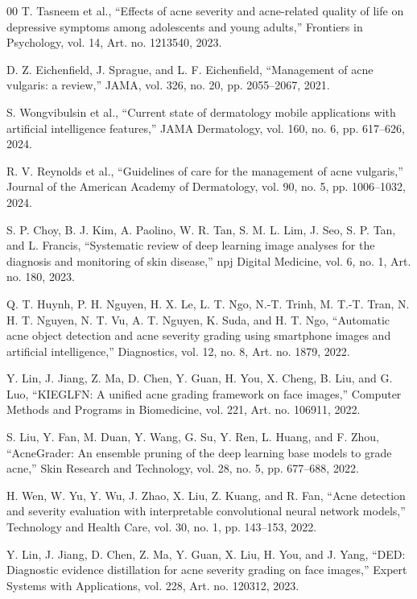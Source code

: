 \documentclass[conference]{IEEEtran}
\begin{document}
\begin{thebibliography}{00}
 T. Tasneem et al., “Effects of acne severity and acne-related quality of life on depressive symptoms among adolescents and young adults,” Frontiers in Psychology, vol. 14, Art. no. 1213540, 2023.

 D. Z. Eichenfield, J. Sprague, and L. F. Eichenfield, “Management of acne vulgaris: a review,” JAMA, vol. 326, no. 20, pp. 2055–2067, 2021.

 S. Wongvibulsin et al., “Current state of dermatology mobile applications with artificial intelligence features,” JAMA Dermatology, vol. 160, no. 6, pp. 617–626, 2024.

 R. V. Reynolds et al., “Guidelines of care for the management of acne vulgaris,” Journal of the American Academy of Dermatology, vol. 90, no. 5, pp. 1006–1032, 2024.

 S. P. Choy, B. J. Kim, A. Paolino, W. R. Tan, S. M. L. Lim, J. Seo, S. P. Tan, and L. Francis, “Systematic review of deep learning image analyses for the diagnosis and monitoring of skin disease,” npj Digital Medicine, vol. 6, no. 1, Art. no. 180, 2023.

 Q. T. Huynh, P. H. Nguyen, H. X. Le, L. T. Ngo, N.-T. Trinh, M. T.-T. Tran, N. H. T. Nguyen, N. T. Vu, A. T. Nguyen, K. Suda, and H. T. Ngo, “Automatic acne object detection and acne severity grading using smartphone images and artificial intelligence,” Diagnostics, vol. 12, no. 8, Art. no. 1879, 2022.

 Y. Lin, J. Jiang, Z. Ma, D. Chen, Y. Guan, H. You, X. Cheng, B. Liu, and G. Luo, “KIEGLFN: A unified acne grading framework on face images,” Computer Methods and Programs in Biomedicine, vol. 221, Art. no. 106911, 2022.

 S. Liu, Y. Fan, M. Duan, Y. Wang, G. Su, Y. Ren, L. Huang, and F. Zhou, “AcneGrader: An ensemble pruning of the deep learning base models to grade acne,” Skin Research and Technology, vol. 28, no. 5, pp. 677–688, 2022.

 H. Wen, W. Yu, Y. Wu, J. Zhao, X. Liu, Z. Kuang, and R. Fan, “Acne detection and severity evaluation with interpretable convolutional neural network models,” Technology and Health Care, vol. 30, no. 1, pp. 143–153, 2022.

 Y. Lin, J. Jiang, D. Chen, Z. Ma, Y. Guan, X. Liu, H. You, and J. Yang, “DED: Diagnostic evidence distillation for acne severity grading on face images,” Expert Systems with Applications, vol. 228, Art. no. 120312, 2023.


\end{thebibliography}
\end{document}

